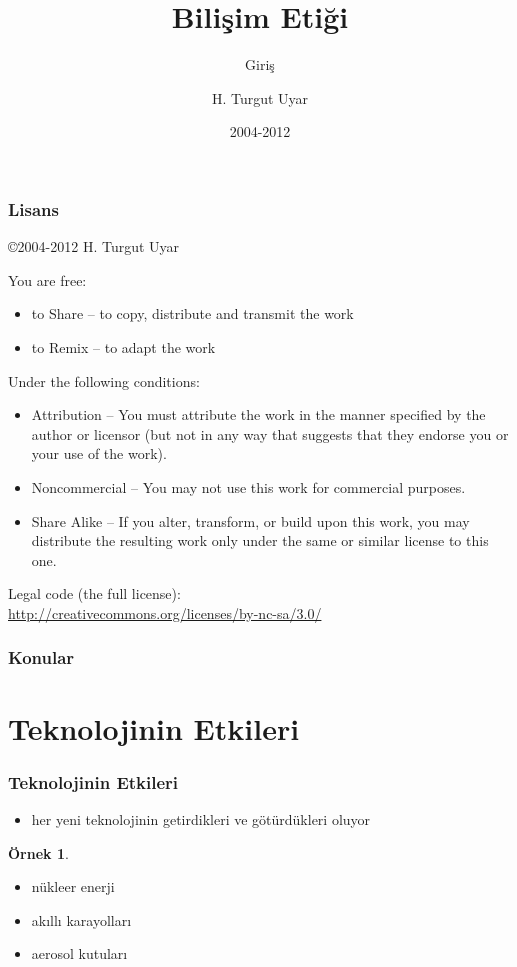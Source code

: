 \documentclass[dvipsnames]{beamer}
\title{Bilişim Etiği}
\subtitle{Giriş}
\author{H. Turgut Uyar}
\date{2004-2012}
\theoremstyle{definition}
\theoremstyle{example}
\newtheorem{ornek}[theorem]{Örnek}
\theoremstyle{plain}
\begin{document}
\begin{frame}
  \titlepage
\end{frame}

\begin{frame}
  \frametitle{Lisans}

  \hfill
  \copyright 2004-2012 H. Turgut Uyar

  \vfill
  \begin{tiny}
    You are free:
    \begin{itemize}
      \item to Share -- to copy, distribute and transmit the work
      \item to Remix -- to adapt the work
    \end{itemize}

    Under the following conditions:
    \begin{itemize}
      \item Attribution -- You must attribute the work in the manner specified by
        the author or licensor (but not in any way that suggests that they
        endorse you or your use of the work).

      \item Noncommercial -- You may not use this work for commercial purposes.

      \item Share Alike -- If you alter, transform, or build upon this work, you
        may distribute the resulting work only under the same or similar license
        to this one.
    \end{itemize}
  \end{tiny}

  \vfill
  Legal code (the full license):\\
  \url{http://creativecommons.org/licenses/by-nc-sa/3.0/}
\end{frame}

\begin{frame}
  \frametitle{Konular}
  \tableofcontents
\end{frame}

\section{Teknolojinin Etkileri}

\begin{frame}
  \frametitle{Teknolojinin Etkileri}

  \begin{itemize}
    \item her yeni teknolojinin getirdikleri ve götürdükleri oluyor
  \end{itemize}

  \begin{ornek}
    \begin{itemize}
      \item nükleer enerji
      \item akıllı karayolları
      \item aerosol kutuları
    \end{itemize}
  \end{ornek}
\end{frame}
\end{document}
